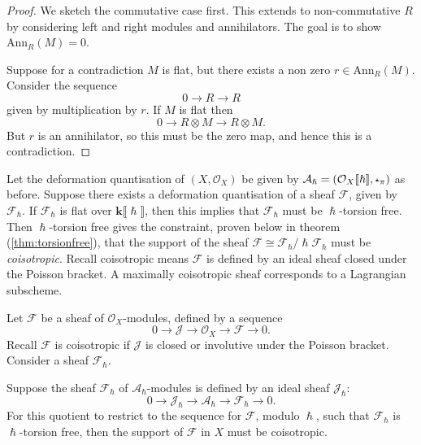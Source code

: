     \begin{proof}
    We sketch the commutative case first. This extends to non-commutative \(R\) by considering left and right modules and annihilators. The goal is to show \( \mathrm{Ann}_R(M) = 0\).

    Suppose for a contradiction \(M\) is flat, but there exists a non zero \(r\in \mathrm{Ann}_R(M)\). Consider the sequence \[ 0 \rightarrow R \rightarrow R \] 
    given by multiplication by \(r\). If \( M\) is flat then
    \[ 0 \rightarrow R \otimes M \rightarrow R \otimes M. \]
    But \(r\) is an annihilator, so this must be the zero map, and hence this is a contradiction.
    \end{proof}
    
    
    Let the deformation quantisation of \((X,\mathcal{O}_X)\) be given by \( \mathcal{A}_\hslash = ( \mathcal{O}_X \lBrack \hslash \rBrack, \starp_{\pi} )  \) as before. Suppose there exists a deformation quantisation of a sheaf \( \mathcal{F}\), given by \( \mathcal{F}_{\hslash}\).
    If \( \mathcal{F}_\hslash \) is flat over \( \mathbf{k} \lBrack \hslash \rBrack \), then this implies that \( \mathcal{F}_{\hslash}\) must be \( \hslash\)-torsion free. Then \(\hslash\)-torsion free gives the constraint, proven below in theorem (\ref{thm:torsionfree}), that the support of the sheaf \(\mathcal{F} \cong \mathcal{F}_{\hslash}/\hslash \mathcal{F}_{\hslash}\) must be \emph{coisotropic}. Recall coisotropic means \( \mathcal{F}\) is defined by an ideal sheaf closed under the Poisson bracket. A maximally coisotropic sheaf corresponds to a Lagrangian subscheme.
   
    Let \( \mathcal{F}\) be a sheaf of \(\mathcal{O}_X \)-modules, defined by a sequence
    \[  0 \rightarrow \mathcal{J} \rightarrow \mathcal{O}_X \rightarrow \mathcal{F} \rightarrow 0. \]
    Recall \( \mathcal{F}\) is coisotropic if \(\mathcal{J}\) is closed or involutive under the Poisson bracket.
    Consider a sheaf \( \mathcal{F}_{\hslash}\). 
    \begin{thm} \label{thm:torsionfree} 
    Suppose the sheaf \( \mathcal{F}_{\hslash}\) of \(\mathcal{A}_{\hslash} \)-modules is defined by an ideal sheaf \( \mathcal{J}_{\hslash} \):
    \[ 0 \rightarrow \mathcal{J}_{\hslash} \rightarrow \mathcal{A}_\hslash \rightarrow \mathcal{F}_{\hslash} \rightarrow 0. \]
    For this quotient to restrict to the sequence for \( \mathcal{F}\), modulo \( \hslash\), such that \( \mathcal{F}_{\hslash}\) is \(\hslash\)-torsion free, then the support of \( \mathcal{F}\) in \(X\) must be coisotropic.
    \end{thm}

